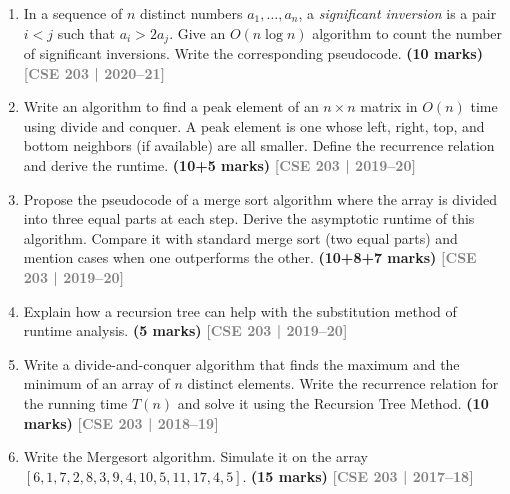 \documentclass[12pt,a3paper]{article}
\newcommand{\yr}[1]{\hfill\textcolor{gray}{\small\textbf{[#1]}}}
\newcommand{\mk}[1]{\textcolor{orange!70!black}{\small\textbf{(#1 marks)}}}
\begin{document}
\begin{enumerate}
\begin{enumerate}[label=(\roman*)]
  Now suppose, the \textit{LEFT} and \textit{RIGHT} partitions, respectively
  calculate $d_L$ and $d_R$ as the distances between the closest pair of points
  within themselves. Now your task is to check whether there exist a pair of
  points $P_{Li}$ and $P_{Rj}$ such that $P_{Li} \in \textit{LEFT}$ and
  $P_{Rj} \in \textit{RIGHT}$, and the distance between $P_{Li}$ and $P_{Rj}$
  is less than $\min(d_L,\ d_R)$.

  \item Write down the steps to perform this checking so that the minimum number
  of comparisons is ensured and the checking can be performed in $O(n)$ time.
\end{enumerate}
\mk{5+10=15}\yr{CSE 203 | 2020--21}

\item In a sequence of $n$ distinct numbers $a_1, \ldots, a_n$, a \emph{significant inversion} is a pair $i < j$ such that $a_i > 2a_j$. Give an $O(n \log n)$ algorithm to count the number of significant inversions. Write the corresponding pseudocode. \mk{10}
\yr{CSE 203 | 2020--21}

\item Write an algorithm to find a peak element of an $n \times n$ matrix in $O(n)$ time using divide and conquer. A peak element is one whose left, right, top, and bottom neighbors (if available) are all smaller. Define the recurrence relation and derive the runtime. \mk{10+5}
\yr{CSE 203 | 2019--20}

\item Propose the pseudocode of a merge sort algorithm where the array is divided into three equal parts at each step. Derive the asymptotic runtime of this algorithm. Compare it with standard merge sort (two equal parts) and mention cases when one outperforms the other. \mk{10+8+7}
\yr{CSE 203 | 2019--20}

\item Explain how a recursion tree can help with the substitution method of runtime analysis. \mk{5}
\yr{CSE 203 | 2019--20}

\item Write a divide-and-conquer algorithm that finds the maximum and the minimum of an array of $n$ distinct elements. Write the recurrence relation for the running time $T(n)$ and solve it using the Recursion Tree Method. \mk{10}
\yr{CSE 203 | 2018--19}

\item Write the Mergesort algorithm. Simulate it on the array $[6, 1, 7, 2, 8, 3, 9, 4, 10, 5, 11, 17, 4, 5]$. \mk{15}
\yr{CSE 203 | 2017--18}


\end{enumerate}
\end{document}
